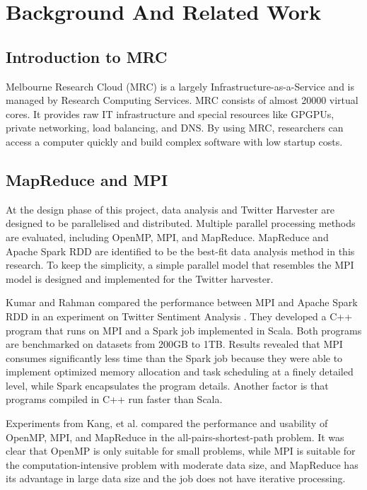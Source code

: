 \section{Background And Related Work}
\subsection{Introduction to MRC}
Melbourne Research Cloud (MRC) is a largely Infrastructure-as-a-Service and is managed by Research Computing Services. MRC consists of almost 20000 virtual cores. It provides raw IT infrastructure and special resources like GPGPUs, private networking, load balancing, and DNS. By using MRC, researchers can access a computer quickly and build complex software with low startup costs\cite{mrc}.

\subsection{MapReduce and MPI}

At the design phase of this project, data analysis and Twitter Harvester are designed to be parallelised and distributed. Multiple parallel processing methods are evaluated, including OpenMP, MPI, and MapReduce. MapReduce and Apache Spark RDD are identified to be the best-fit data analysis method in this research. To keep the simplicity, a simple parallel model that resembles the MPI model is designed and implemented for the Twitter harvester.

Kumar and Rahman compared the performance between MPI and Apache Spark RDD in an experiment on Twitter Sentiment Analysis \cite{kumar_rahman_2017}. They developed a C++ program that runs on MPI and a Spark job implemented in Scala. Both programs are benchmarked on datasets from 200GB to 1TB. Results revealed that MPI consumes significantly less time than the Spark job because they were able to implement optimized memory allocation and task scheduling at a finely detailed level, while Spark encapsulates the program details. Another factor is that programs compiled in C++ run faster than Scala. 

Experiments from Kang, et al. \cite{kang_lee_lee_2015} compared the performance and usability of OpenMP, MPI, and MapReduce in the all-pairs-shortest-path problem. It was clear that OpenMP is only suitable for small problems, while MPI is suitable for the computation-intensive problem with moderate data size, and MapReduce has its advantage in large data size and the job does not have iterative processing. 


